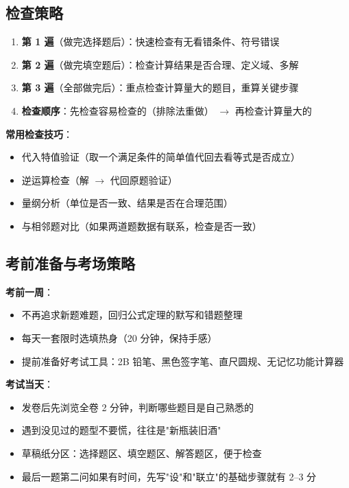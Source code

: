 \subsection{检查策略}

\begin{enumerate}
  \item \textbf{第 1 遍}（做完选择题后）：快速检查有无看错条件、符号错误
  \item \textbf{第 2 遍}（做完填空题后）：检查计算结果是否合理、定义域、多解
  \item \textbf{第 3 遍}（全部做完后）：重点检查计算量大的题目，重算关键步骤
  \item \textbf{检查顺序}：先检查容易检查的（排除法重做） $\to$ 再检查计算量大的
\end{enumerate}

\textbf{常用检查技巧}：
\begin{itemize}
  \item 代入特值验证（取一个满足条件的简单值代回去看等式是否成立）
  \item 逆运算检查（解 $\to$ 代回原题验证）
  \item 量纲分析（单位是否一致、结果是否在合理范围）
  \item 与相邻题对比（如果两道题数据有联系，检查是否一致）
\end{itemize}

\subsection{考前准备与考场策略}

\textbf{考前一周}：
\begin{itemize}
  \item 不再追求新题难题，回归公式定理的默写和错题整理
  \item 每天一套限时选填热身（20 分钟，保持手感）
  \item 提前准备好考试工具：2B 铅笔、黑色签字笔、直尺圆规、无记忆功能计算器
\end{itemize}

\textbf{考试当天}：
\begin{itemize}
  \item 发卷后先浏览全卷 2 分钟，判断哪些题目是自己熟悉的
  \item 遇到没见过的题型不要慌，往往是"新瓶装旧酒"
  \item 草稿纸分区：选择题区、填空题区、解答题区，便于检查
  \item 最后一题第二问如果有时间，先写"设"和"联立"的基础步骤就有 2--3 分
\end{itemize}

